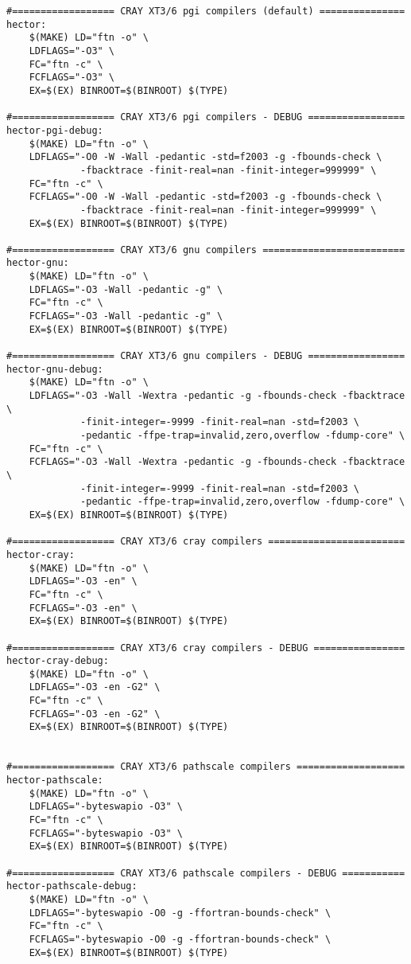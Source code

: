 \begin{verbatim}
#================== CRAY XT3/6 pgi compilers (default) ===============
hector:
	$(MAKE) LD="ftn -o" \
	LDFLAGS="-O3" \
	FC="ftn -c" \
	FCFLAGS="-O3" \
	EX=$(EX) BINROOT=$(BINROOT) $(TYPE)

#================== CRAY XT3/6 pgi compilers - DEBUG =================
hector-pgi-debug:
	$(MAKE) LD="ftn -o" \
	LDFLAGS="-O0 -W -Wall -pedantic -std=f2003 -g -fbounds-check \
	         -fbacktrace -finit-real=nan -finit-integer=999999" \
	FC="ftn -c" \
	FCFLAGS="-O0 -W -Wall -pedantic -std=f2003 -g -fbounds-check \
	         -fbacktrace -finit-real=nan -finit-integer=999999" \
	EX=$(EX) BINROOT=$(BINROOT) $(TYPE)

#================== CRAY XT3/6 gnu compilers =========================
hector-gnu:
	$(MAKE) LD="ftn -o" \
	LDFLAGS="-O3 -Wall -pedantic -g" \
	FC="ftn -c" \
	FCFLAGS="-O3 -Wall -pedantic -g" \
	EX=$(EX) BINROOT=$(BINROOT) $(TYPE)

#================== CRAY XT3/6 gnu compilers - DEBUG =================
hector-gnu-debug:
	$(MAKE) LD="ftn -o" \
	LDFLAGS="-O3 -Wall -Wextra -pedantic -g -fbounds-check -fbacktrace \
	         -finit-integer=-9999 -finit-real=nan -std=f2003 \
	         -pedantic -ffpe-trap=invalid,zero,overflow -fdump-core" \
	FC="ftn -c" \
	FCFLAGS="-O3 -Wall -Wextra -pedantic -g -fbounds-check -fbacktrace \
	         -finit-integer=-9999 -finit-real=nan -std=f2003 \
	         -pedantic -ffpe-trap=invalid,zero,overflow -fdump-core" \
	EX=$(EX) BINROOT=$(BINROOT) $(TYPE)

#================== CRAY XT3/6 cray compilers ========================
hector-cray:
	$(MAKE) LD="ftn -o" \
	LDFLAGS="-O3 -en" \
	FC="ftn -c" \
	FCFLAGS="-O3 -en" \
	EX=$(EX) BINROOT=$(BINROOT) $(TYPE)

#================== CRAY XT3/6 cray compilers - DEBUG ================
hector-cray-debug:
	$(MAKE) LD="ftn -o" \
	LDFLAGS="-O3 -en -G2" \
	FC="ftn -c" \
	FCFLAGS="-O3 -en -G2" \
	EX=$(EX) BINROOT=$(BINROOT) $(TYPE)


#================== CRAY XT3/6 pathscale compilers ===================
hector-pathscale:
	$(MAKE) LD="ftn -o" \
	LDFLAGS="-byteswapio -O3" \
	FC="ftn -c" \
	FCFLAGS="-byteswapio -O3" \
	EX=$(EX) BINROOT=$(BINROOT) $(TYPE)

#================== CRAY XT3/6 pathscale compilers - DEBUG ===========
hector-pathscale-debug:
	$(MAKE) LD="ftn -o" \
	LDFLAGS="-byteswapio -O0 -g -ffortran-bounds-check" \
	FC="ftn -c" \
	FCFLAGS="-byteswapio -O0 -g -ffortran-bounds-check" \
	EX=$(EX) BINROOT=$(BINROOT) $(TYPE)


\end{verbatim}
